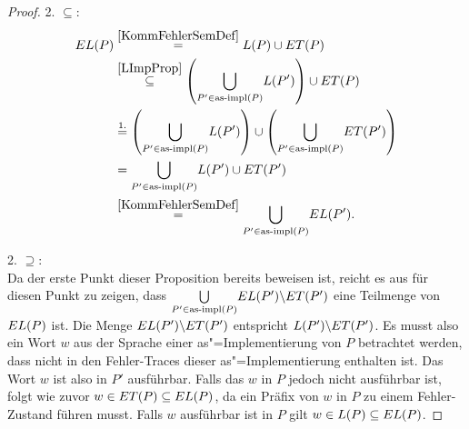 \begin{proof}
  2. \glqq$\subseteq$\grqq{}:
  {\allowdisplaybreaks
  \begin{align*}
    EL (P)&\overset{\ref{KommFehlerSemDef}}{=} L(P)\cup ET (P)\\
    &\overset{\ref{LImpProp}}{\subseteq} \left(\underset{P'\in\mathrm{as}\text{-}\mathrm{impl}
    (P)}{\bigcup} L (P')\right)\cup ET (P)\\
    &\overset{1.}{=} \left(\underset{P'\in\mathrm{as}\text{-}\mathrm{impl} (P)}{\bigcup} L
    (P')\right)\cup \left(\underset{P'\in\mathrm{as}\text{-}\mathrm{impl} (P)}{\bigcup} ET (P')\right)\\
    &= \underset{P'\in\mathrm{as}\text{-}\mathrm{impl} (P)}{\bigcup} L (P')\cup ET (P')\\
    &\overset{\ref{KommFehlerSemDef}}{=} \underset{P'\in\mathrm{as}\text{-}\mathrm{impl} (P)}{\bigcup}
    EL (P').
  \end{align*}}

  2. \glqq$\supseteq$\grqq{}:\\
  Da der erste Punkt dieser Proposition bereits beweisen ist, reicht es aus für
  diesen Punkt zu zeigen, dass $\underset{P'\in\mathrm{as}\text{-}\mathrm{impl} (P)}{\bigcup} EL
  (P')\backslash ET (P')$ eine Teilmenge von $EL (P)$ ist. Die Menge $EL
  (P')\backslash ET (P')$ entspricht $L (P') \backslash ET (P')$. Es musst
  also ein Wort $w$ aus der Sprache einer as"=Implementierung von $P$
  betrachtet werden, dass nicht in den Fehler-Traces dieser as"=Implementierung
  enthalten ist. Das Wort $w$ ist also in $P'$ ausführbar. Falls das $w$ in $P$
  jedoch nicht ausführbar ist, folgt wie zuvor $w\in ET (P)\subseteq EL (P)$,
  da ein Präfix von $w$ in $P$ zu einem Fehler-Zustand führen musst. Falls $w$
  ausführbar ist in $P$ gilt $w\in L(P)\subseteq EL (P)$.
\end{proof}

